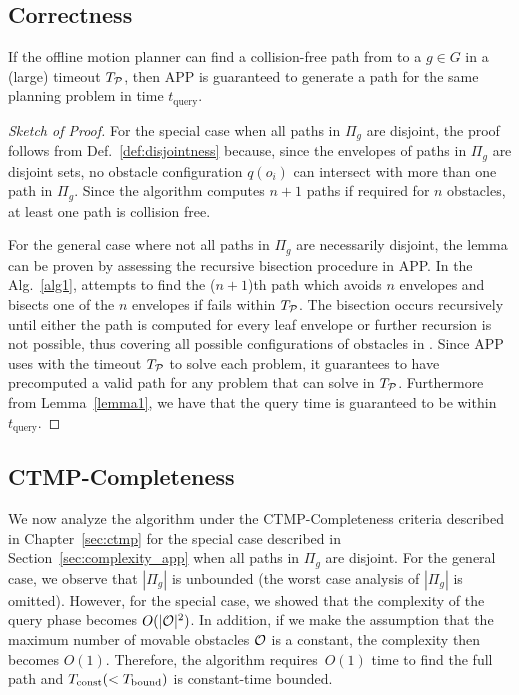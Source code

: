 \documentclass[a4paper]{report}
\begin{document}
\subsection{Correctness}
\begin{lemma}
\label{lemma:complete_app}
If the offline motion planner \calP can find a collision-free path from \Sstart to a $g \in G$ in a (large) timeout $T_\mathcal{P}$, then APP is guaranteed to generate a path for the same planning problem in time $t_{\textrm {query}}$.
\end{lemma}
\begin{proof}[Sketch of Proof]
For the special case when all paths in $\Pi_g$ are disjoint, the proof follows from Def.~\ref{def:disjointness} because, since the envelopes of paths in $\Pi_g$ are disjoint sets, no obstacle configuration $q(o_i)$ can intersect with more than one path in $\Pi_g$. Since the algorithm computes $n+1$ paths if required for $n$ obstacles, at least one path is collision free.

For the general case where not all paths in $\Pi_g$ are necessarily disjoint, the lemma can be proven by assessing the recursive bisection procedure in APP. In the Alg.~\ref{alg1}, \calP attempts to find the ($n+1$)th path which avoids $n$ envelopes and bisects one of the $n$ envelopes if \calP fails within $T_\mathcal{P}$. The bisection occurs recursively until either the path is computed for every leaf envelope or further recursion is not possible, thus covering all possible configurations of obstacles in \calO. Since APP uses \calP with the timeout $T_\mathcal{P}$ to solve each problem, it guarantees to have precomputed a valid path for any problem that \calP can solve in $T_\mathcal{P}$.
Furthermore from Lemma~\ref{lemma1}, we have that the query time is guaranteed to be within $t_{\textrm {query}}$.
\end{proof}

\subsection{CTMP-Completeness}
We now analyze the algorithm under the CTMP-Completeness criteria described in Chapter~\ref{sec:ctmp} for the special case described in Section~\ref{sec:complexity_app} when all paths in $\Pi_g$ are disjoint. For the general case, we observe that $|\Pi_g|$ is unbounded (the worst case analysis of $|\Pi_g|$ is omitted). However, for the special case, we showed that the complexity of the query phase becomes $O(|\mathcal{O}|^2)$. In addition, if we make the assumption that the maximum number of movable obstacles $\mathcal{O}$ is a constant, the complexity then becomes $O(1)$.
%
Therefore, the algorithm requires~$O(1)$ time to find the full path and $T_\textrm{const} (< T_{\textrm{bound}})$ is constant-time bounded.
\end{document}
